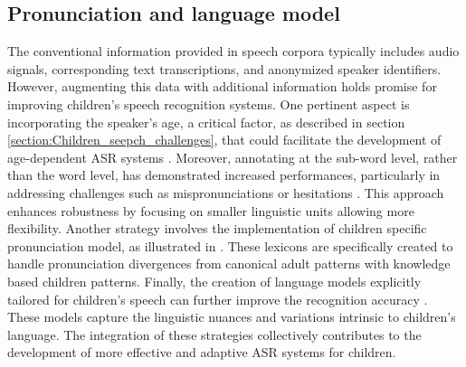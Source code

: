 \subsection{Pronunciation and language model}
The conventional information provided in speech corpora typically includes audio signals, corresponding text transcriptions, and anonymized speaker identifiers. However, augmenting this data with additional information holds promise for improving children's speech recognition systems. One pertinent aspect is incorporating the speaker's age, a critical factor, as described in section \ref{section:Children_seepch_challenges}, that could facilitate the development of age-dependent ASR systems \cite{linguistic-children, gale2019improving}. 
Moreover, annotating at the sub-word level, rather than the word level, has demonstrated increased performances, particularly in addressing challenges such as mispronunciations or hesitations \cite{subwords}. This approach enhances robustness by focusing on smaller linguistic units allowing more flexibility. Another strategy involves the implementation of children specific pronunciation model, as illustrated in \cite{pronunciation,pronunciation2}. These lexicons are specifically created to handle pronunciation divergences from canonical adult patterns with knowledge based children patterns.
Finally, the creation of language models explicitly tailored for children's speech can further improve the recognition accuracy \cite{children_language_model2,Children_language_model}. These models capture the linguistic nuances and variations intrinsic to children's language. The integration of these strategies collectively contributes to the development of more effective and adaptive ASR systems for children.


